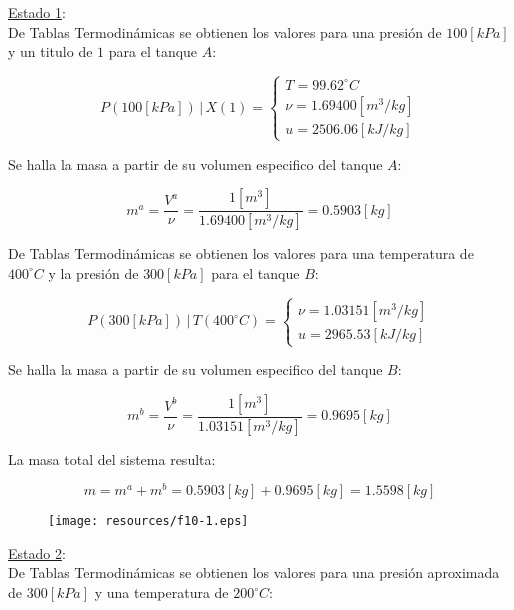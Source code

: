 \documentclass[letter,11pt]{article}
\begin{document}
\begin{enumerate}
\underline{Estado 1}: \\
De Tablas Termodinámicas se obtienen los valores para una presión de
$100[kPa]$ y un titulo de $1$ para el tanque $A$:

\begin{equation*}
    P(100[kPa])\,|\,X(1) = \begin{cases}
        T = 99.62^\circ C \\
        \nu = 1.69400[m^3/kg] \\
        u = 2506.06[kJ/kg]
    \end{cases}
\end{equation*}

Se halla la masa a partir de su volumen especifico del tanque $A$:

\begin{equation*}
    m^a = \frac{V^a}{\nu} = \frac{1[m^3]}{1.69400[m^3/kg]}
      = 0.5903[kg]
\end{equation*}

De Tablas Termodinámicas se obtienen los valores para una temperatura de
$400^\circ C$ y la presión de $300[kPa]$ para el tanque $B$:

\begin{equation*}
    P(300[kPa])\,|\,T(400^\circ C) = \begin{cases}
        \nu = 1.03151[m^3/kg] \\
        u = 2965.53[kJ/kg]
    \end{cases}
\end{equation*}

Se halla la masa a partir de su volumen especifico del tanque $B$:

\begin{equation*}
    m^b = \frac{V^b}{\nu} = \frac{1[m^3]}{1.03151[m^3/kg]}
      = 0.9695[kg]
\end{equation*}

La masa total del sistema resulta:

\begin{equation*}
    m = m^a + m^b = 0.5903[kg] + 0.9695[kg] = 1.5598[kg]
\end{equation*}

\begin{figure}[H]
\centering
\texttt{[image: resources/f10-1.eps]}
\end{figure}

\underline{Estado 2}: \\
De Tablas Termodinámicas se obtienen los valores para una presión aproximada de
$300[kPa]$ y una temperatura de $200^\circ C$:


\end{enumerate}
\end{document}
